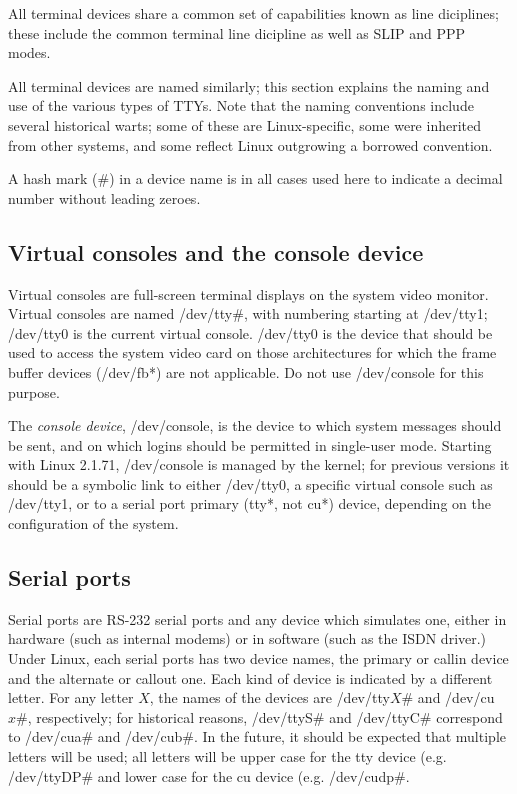 All terminal devices share a common set of capabilities known as line
diciplines; these include the common terminal line dicipline as well
as SLIP and PPP modes.

All terminal devices are named similarly; this section explains the
naming and use of the various types of TTYs.  Note that the naming
conventions include several historical warts; some of these are
Linux-specific, some were inherited from other systems, and some
reflect Linux outgrowing a borrowed convention.

A hash mark ($\#$) in a device name is in all cases used here to
indicate a decimal number without leading zeroes.

\subsection{Virtual consoles and the console device}

Virtual consoles are full-screen terminal displays on the system video
monitor.  Virtual consoles are named {\file /dev/tty$\#$}, with
numbering starting at {\file /dev/tty1}; {\file /dev/tty0} is the
current virtual console.  {\file /dev/tty0} is the device that should
be used to access the system video card on those architectures for
which the frame buffer devices ({\file /dev/fb*}) are not applicable.
Do not use {\file /dev/console} for this purpose.

The {\em console device\/}, {\file /dev/console}, is the device to
which system messages should be sent, and on which logins should be
permitted in single-user mode.  Starting with Linux 2.1.71, {\file
/dev/console} is managed by the kernel; for previous versions it
should be a symbolic link to either {\file /dev/tty0}, a specific
virtual console such as {\file /dev/tty1}, or to a serial port primary
({\file tty*}, not {\file cu*}) device, depending on the configuration
of the system.

\subsection{Serial ports}

Serial ports are RS-232 serial ports and any device which simulates
one, either in hardware (such as internal modems) or in software (such
as the ISDN driver.)  Under Linux, each serial ports has two device
names, the primary or callin device and the alternate or callout one.
Each kind of device is indicated by a different letter.  For any
letter $X$, the names of the devices are {\file /dev/tty${X\#}$} and
{\file /dev/cu${x\#}$}, respectively; for historical reasons, {\file
/dev/ttyS$\#$} and {\file /dev/ttyC$\#$} correspond to {\file
/dev/cua$\#$} and {\file /dev/cub$\#$}.  In the future, it should be
expected that multiple letters will be used; all letters will be upper
case for the {\file tty} device (e.g. {\file /dev/ttyDP$\#$} and lower
case for the {\file cu} device (e.g. {\file /dev/cudp$\#$}.

